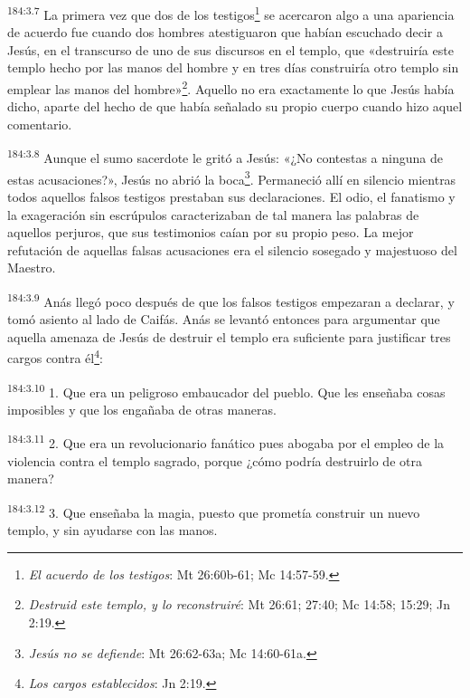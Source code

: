 \par
\textsuperscript{184:3.7} La primera vez que dos de los testigos\footnote{\textit{El acuerdo de los testigos}: Mt 26:60b-61; Mc 14:57-59.} se acercaron algo a una apariencia de acuerdo fue cuando dos hombres atestiguaron que habían escuchado decir a Jesús, en el transcurso de uno de sus discursos en el templo, que «destruiría este templo hecho por las manos del hombre y en tres días construiría otro templo sin emplear las manos del hombre»\footnote{\textit{Destruid este templo, y lo reconstruiré}: Mt 26:61; 27:40; Mc 14:58; 15:29; Jn 2:19.}. Aquello no era exactamente lo que Jesús había dicho, aparte del hecho de que había señalado su propio cuerpo cuando hizo aquel comentario.

\par
\textsuperscript{184:3.8} Aunque el sumo sacerdote le gritó a Jesús: «¿No contestas a ninguna de estas acusaciones?», Jesús no abrió la boca\footnote{\textit{Jesús no se defiende}: Mt 26:62-63a; Mc 14:60-61a.}. Permaneció allí en silencio mientras todos aquellos falsos testigos prestaban sus declaraciones. El odio, el fanatismo y la exageración sin escrúpulos caracterizaban de tal manera las palabras de aquellos perjuros, que sus testimonios caían por su propio peso. La mejor refutación de aquellas falsas acusaciones era el silencio sosegado y majestuoso del Maestro.

\par
\textsuperscript{184:3.9} Anás llegó poco después de que los falsos testigos empezaran a declarar, y tomó asiento al lado de Caifás. Anás se levantó entonces para argumentar que aquella amenaza de Jesús de destruir el templo era suficiente para justificar tres cargos contra él\footnote{\textit{Los cargos establecidos}: Jn 2:19.}:

\par
\textsuperscript{184:3.10} 1. Que era un peligroso embaucador del pueblo. Que les enseñaba cosas imposibles y que los engañaba de otras maneras.

\par
\textsuperscript{184:3.11} 2. Que era un revolucionario fanático pues abogaba por el empleo de la violencia contra el templo sagrado, porque ¿cómo podría destruirlo de otra manera?

\par
\textsuperscript{184:3.12} 3. Que enseñaba la magia, puesto que prometía construir un nuevo templo, y sin ayudarse con las manos.

